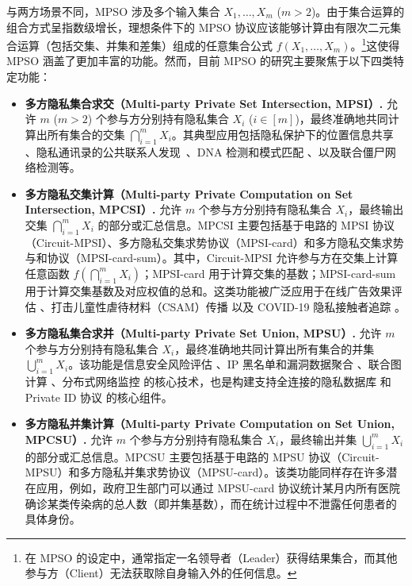 与两方场景不同，MPSO 涉及多个输入集合 $X_1, \dots, X_m$ ($m > 2$)。由于集合运算的组合方式呈指数级增长，理想条件下的 MPSO 协议应该能够计算由有限次二元集合运算（包括交集、并集和差集）组成的任意集合公式 $f(X_1, \dots, X_m)$。\footnote{在 MPSO 的设定中，通常指定一名领导者（Leader）获得结果集合，而其他参与方（Client）无法获取除自身输入外的任何信息。}这使得 MPSO 涵盖了更加丰富的功能。然而，目前 MPSO 的研究主要聚焦于以下四类特定功能：
\begin{itemize}
    \item \textbf{多方隐私集合求交（Multi-party Private Set Intersection, MPSI）.} 允许 $m$ ($m > 2$) 个参与方分别持有隐私集合 $X_i$ ($i \in [m]$)，最终准确地共同计算出所有集合的交集 $\bigcap_{i=1}^m X_i$。其典型应用包括隐私保护下的位置信息共享 \cite{NTLHB-NDSS-2011}、隐私通讯录的公共联系人发现~\cite{DRRT-PPET-2018}、DNA 检测和模式匹配 \cite{TKC-CCS-2007}、以及联合僵尸网络检测等。
    
    \item \textbf{多方隐私交集计算（Multi-party Private Computation on Set Intersection, MPCSI）.} 允许 $m$ 个参与方分别持有隐私集合 $X_i$，最终输出交集 $\bigcap_{i=1}^m X_i$ 的部分或汇总信息。MPCSI 主要包括基于电路的 MPSI 协议（Circuit-MPSI）、多方隐私交集求势协议（MPSI-card）和多方隐私交集求势与和协议（MPSI-card-sum）。其中，Circuit-MPSI 允许参与方在交集上计算任意函数 $f(\bigcap_{i=1}^m X_i)$；MPSI-card 用于计算交集的基数；MPSI-card-sum 用于计算交集基数及对应权值的总和。这类功能被广泛应用于在线广告效果评估 \cite{Ion-EUROSP-2020}、打击儿童性虐待材料（CSAM）传播 \cite{BBM21} 以及 COVID-19 隐私接触者追踪 \cite{BBV20,DPT20,DIL20}。
    
    \item \textbf{多方隐私集合求并（Multi-party Private Set Union, MPSU）.} 允许 $m$ 个参与方分别持有隐私集合 $X_i$，最终准确地共同计算出所有集合的并集 $\bigcup_{i=1}^m X_i$。该功能是信息安全风险评估 \cite{LV04}、IP 黑名单和漏洞数据聚合 \cite{HLSSSYY16}、联合图计算 \cite{BllS05}、分布式网络监控 \cite{KS-CRYPTO-2005} 的核心技术，也是构建支持全连接的隐私数据库 \cite{KRTW-ASIACRYPT-2019} 和 Private ID 协议 \cite{GMRSS-PKC-2021} 的核心组件。
    
    \item \textbf{多方隐私并集计算（Multi-party Private Computation on Set Union, MPCSU）.} 允许 $m$ 个参与方分别持有隐私集合 $X_i$，最终输出并集 $\bigcup_{i=1}^m X_i$ 的部分或汇总信息。MPCSU 主要包括基于电路的 MPSU 协议（Circuit-MPSU）和多方隐私并集求势协议（MPSU-card）。该类功能同样存在许多潜在应用，例如，政府卫生部门可以通过 MPSU-card 协议统计某月内所有医院确诊某类传染病的总人数（即并集基数），而在统计过程中不泄露任何患者的具体身份。
\end{itemize}

